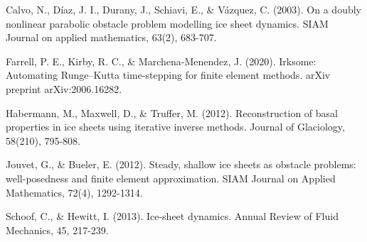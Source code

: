\documentclass{article}
\theoremstyle{definition}
\theoremstyle{plain}
\begin{document}
Calvo, N., Díaz, J. I., Durany, J., Schiavi, E., \& Vázquez, C. (2003). On a doubly nonlinear parabolic obstacle problem modelling ice sheet dynamics. SIAM Journal on applied mathematics, 63(2), 683-707.

Farrell, P. E., Kirby, R. C., \& Marchena-Menendez, J. (2020). Irksome: Automating Runge--Kutta time-stepping for finite element methods. arXiv preprint arXiv:2006.16282.

Habermann, M., Maxwell, D., \& Truffer, M. (2012). Reconstruction of basal properties in ice sheets using iterative inverse methods. Journal of Glaciology, 58(210), 795-808.

Jouvet, G., \& Bueler, E. (2012). Steady, shallow ice sheets as obstacle problems: well-posedness and finite element approximation. SIAM Journal on Applied Mathematics, 72(4), 1292-1314.

Schoof, C., \& Hewitt, I. (2013). Ice-sheet dynamics. Annual Review of Fluid Mechanics, 45, 217-239.
\end{document}
